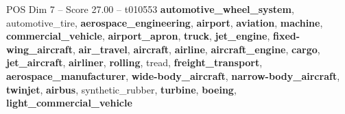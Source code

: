 \begin{textsample}{POS Dim 7 – Score 27.00 – t010553}  \label{ex:f7_pos_006}
\textbf{automotive\_wheel\_system}, automotive\_tire, \textbf{aerospace\_engineering}, \textbf{airport}, \textbf{aviation}, \textbf{machine}, \textbf{commercial\_vehicle}, \textbf{airport\_apron}, \textbf{truck}, \textbf{jet\_engine}, \textbf{fixed-wing\_aircraft}, \textbf{air\_travel}, \textbf{aircraft}, \textbf{airline}, \textbf{aircraft\_engine}, \textbf{cargo}, \textbf{jet\_aircraft}, \textbf{airliner}, \textbf{rolling}, tread, \textbf{freight\_transport}, \textbf{aerospace\_manufacturer}, \textbf{wide-body\_aircraft}, \textbf{narrow-body\_aircraft}, \textbf{twinjet}, \textbf{airbus}, synthetic\_rubber, \textbf{turbine}, \textbf{boeing}, \textbf{light\_commercial\_vehicle}

\end{textsample}
